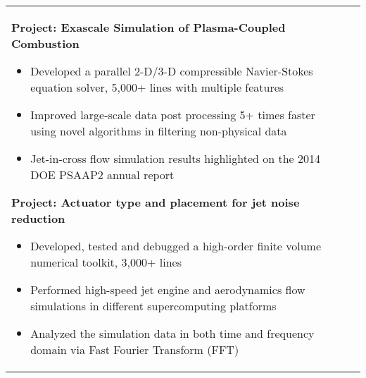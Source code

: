 \documentclass[11pt]{article}
\begin{document}
\begin{tabularx}{\textwidth}{>{\raggedright}X>{\raggedleft}p{}}
{\begin{itemize}[leftmargin = 16pt]
\end{itemize}
\textbf{Project: Exascale Simulation of Plasma-Coupled Combustion}
\begin{itemize}[leftmargin = 16pt]
\item Developed a parallel 2-D/3-D compressible Navier-Stokes equation solver, 5,000+ lines with multiple features
\item Improved large-scale data post processing 5+ times faster using novel algorithms in filtering non-physical data 
\item Jet-in-cross flow simulation results highlighted on the 2014 DOE PSAAP2 annual report 
\end{itemize}
\textbf{Project: Actuator type and placement for jet noise reduction}
\begin{itemize}[leftmargin = 16pt]
\item Developed, tested and debugged a high-order finite volume numerical toolkit, 3,000+ lines
\item Performed high-speed jet engine and aerodynamics flow simulations in different supercomputing platforms
\item Analyzed the simulation data in both time and frequency domain via Fast Fourier Transform (FFT)
\end{itemize}
}
\end{tabularx}
\end{document}
